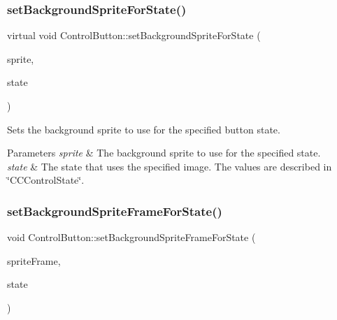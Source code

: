 \subsubsection{\texorpdfstring{set\+Background\+Sprite\+For\+State()}{setBackgroundSpriteForState()}\hspace{0.1cm}{\footnotesize\ttfamily [2/2]}}
{\footnotesize\ttfamily virtual void Control\+Button\+::set\+Background\+Sprite\+For\+State (\begin{DoxyParamCaption}\item[{cocos2d\+::ui\+::\+Scale9\+Sprite $\ast$}]{sprite,  }\item[{\hyperlink{classControl_a89e9598cd785841ac91cff3c4798c469}{State}}]{state }\end{DoxyParamCaption})\hspace{0.3cm}{\ttfamily [virtual]}}

Sets the background sprite to use for the specified button state.


\begin{DoxyParams}{Parameters}
{\em sprite} & The background sprite to use for the specified state. \\
\hline
{\em state} & The state that uses the specified image. The values are described in \char`\"{}\+C\+C\+Control\+State\char`\"{}. \\
\hline
\end{DoxyParams}
\mbox{\label{classControlButton_a16eeede3ea83110e18b9701ae4e519eb}} 
\subsubsection{\texorpdfstring{set\+Background\+Sprite\+Frame\+For\+State()}{setBackgroundSpriteFrameForState()}\hspace{0.1cm}{\footnotesize\ttfamily [1/2]}}
{\footnotesize\ttfamily void Control\+Button\+::set\+Background\+Sprite\+Frame\+For\+State (\begin{DoxyParamCaption}\item[{\hyperlink{classSpriteFrame}{Sprite\+Frame} $\ast$}]{sprite\+Frame,  }\item[{\hyperlink{classControl_a89e9598cd785841ac91cff3c4798c469}{State}}]{state }\end{DoxyParamCaption})\hspace{0.3cm}{\ttfamily [virtual]}}

